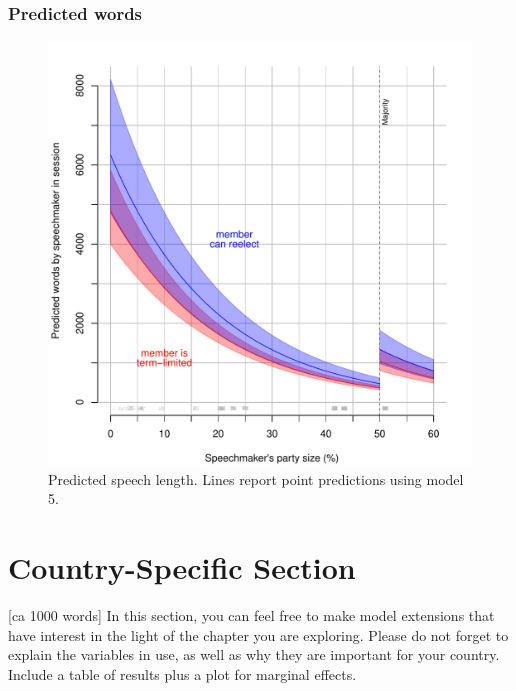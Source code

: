 \documentclass[letter,12pt]{article}
\begin{document}

    \subsubsection{Predicted words}

\begin{figure}
  \centering
    \includegraphics[width=.5\columnwidth]{../plots/predictedWords.pdf}
    \caption{Predicted speech length. Lines report point predictions using model 5.}\label{F:predict}
\end{figure}


  
\section{Country-Specific Section} [ca 1000 words]
In this section, you can feel free to make model extensions that have interest in the light of the chapter you are exploring. Please do not forget to explain the variables in use, as well as why they are important for your country. Include a table of results plus a plot for marginal effects. 
\end{document}
